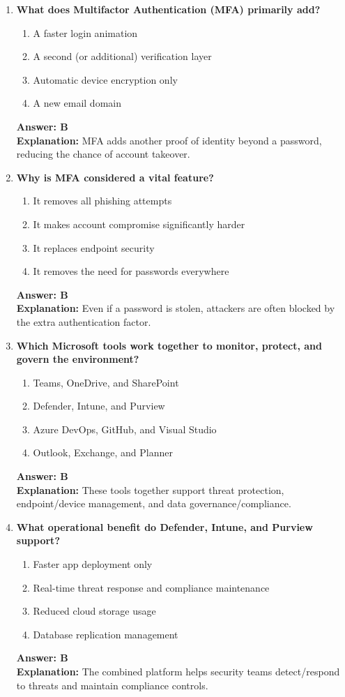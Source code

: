 \documentclass[10pt]{article}
\begin{document}
\begin{enumerate}[leftmargin=*]
\item \textbf{What does Multifactor Authentication (MFA) primarily add?}
\begin{enumerate}[label=\Alph*.]
  \item A faster login animation
  \item A second (or additional) verification layer
  \item Automatic device encryption only
  \item A new email domain
\end{enumerate}
\textbf{Answer: B}\\
\textbf{Explanation:} MFA adds another proof of identity beyond a password, reducing the chance of account takeover.

\item \textbf{Why is MFA considered a vital feature?}
\begin{enumerate}[label=\Alph*.]
  \item It removes all phishing attempts
  \item It makes account compromise significantly harder
  \item It replaces endpoint security
  \item It removes the need for passwords everywhere
\end{enumerate}
\textbf{Answer: B}\\
\textbf{Explanation:} Even if a password is stolen, attackers are often blocked by the extra authentication factor.

\item \textbf{Which Microsoft tools work together to monitor, protect, and govern the environment?}
\begin{enumerate}[label=\Alph*.]
  \item Teams, OneDrive, and SharePoint
  \item Defender, Intune, and Purview
  \item Azure DevOps, GitHub, and Visual Studio
  \item Outlook, Exchange, and Planner
\end{enumerate}
\textbf{Answer: B}\\
\textbf{Explanation:} These tools together support threat protection, endpoint/device management, and data governance/compliance.

\item \textbf{What operational benefit do Defender, Intune, and Purview support?}
\begin{enumerate}[label=\Alph*.]
  \item Faster app deployment only
  \item Real-time threat response and compliance maintenance
  \item Reduced cloud storage usage
  \item Database replication management
\end{enumerate}
\textbf{Answer: B}\\
\textbf{Explanation:} The combined platform helps security teams detect/respond to threats and maintain compliance controls.

\end{enumerate}
\end{document}
